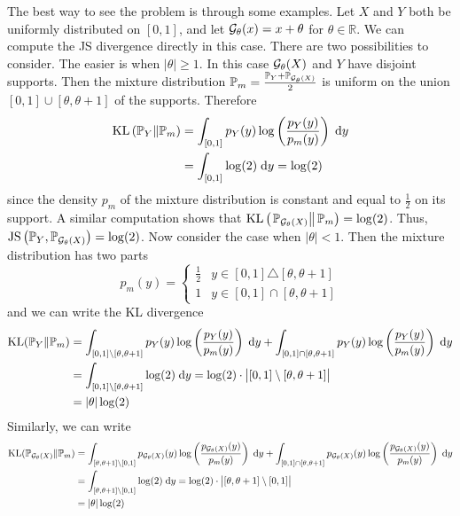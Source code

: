 \documentclass{article}
\newcommand{\dee}{\;\mathrm{d}}
\newcommand{\R}{\mathbb{R}}
\begin{document}
	The best way to see the problem is through some examples. Let \(X\) and \(Y\) both be uniformly distributed on \([0,1]\), and let \(\mathcal{G}_\theta(x) = x + \theta\) for \(\theta \in \R\). We can compute the JS divergence directly in this case. There are two possibilities to consider. The easier is when \(|\theta|\ge 1\). In this case \(\mathcal{G}_\theta(X)\) and \(Y\) have disjoint supports. Then the mixture distribution \(\mathbb{P}_m = \frac{\mathbb{P}_Y + \mathbb{P}_{\mathcal{G}_\theta(X)}}{2}\) is uniform on the union \([0,1]\cup[\theta, \theta + 1]\) of the supports. Therefore
	\begin{align*}
		\kld\left(\prob_Y \Vert \prob_m\right) &= \int_{[0,1]}p_Y(y)\log\left(\frac{p_Y(y)}{p_m(y)}\right)\dee y \\
		&= \int_{[0,1]} \log(2) \dee y = \log(2)
	\end{align*}
	since the density \(p_m\) of the mixture distribution is constant and equal to \(\frac{1}{2}\) on its support. A similar computation shows that \(\mathrm{KL}\left(\left.\mathbb{P}_{\mathcal{G}_\theta(X)}\right\Vert \mathbb{P}_m\right) = \log(2)\). Thus, \(\mathrm{JS}\left(\mathbb{P}_Y, \mathbb{P}_{\mathcal{G}_\theta(X)}\right) = \log(2)\). Now consider the case when \(|\theta| < 1\). Then the mixture distribution has two parts
	\begin{equation*}
		p_m(y) = \begin{cases}
			\frac{1}{2} & y \in [0,1] \triangle [\theta, \theta + 1] \\
			1 & y \in [0,1] \cap [\theta, \theta + 1]
		\end{cases}
	\end{equation*}
	and we can write the KL divergence
	\begin{align*}
		\kld(\prob_Y\Vert\prob_m) &= \int_{[0,1] \setminus [\theta, \theta + 1]} p_Y(y)\log\left(\frac{p_Y(y)}{p_m(y)}\right) \dee y + \int_{ [0,1] \cap [\theta, \theta + 1]} p_Y(y)\log\left(\frac{p_Y(y)}{p_m(y)}\right) \dee y \\
		&= \int_{ [0,1] \setminus [\theta, \theta + 1]} \log(2) \dee y = \log(2) \cdot \big|[0,1] \setminus[\theta, \theta+1]\big| \\
		&= |\theta|\log(2)
	\end{align*}
	Similarly, we can write
	\begin{align*}
		\kld(\prob_{\generator_{\theta}(X)} \Vert\prob_m) &= \int_{[\theta, \theta+1]\setminus[0,1]}p_{\generator_\theta(X)}(y)\log\left(\frac{p_{\generator_\theta(X)}(y)}{p_m(y)}\right)\dee y + \int_{[0,1] \cap [\theta, \theta + 1]}p_{\generator_\theta(X)}(y)\log\left(\frac{p_{\generator_\theta(X)}(y)}{p_m(y)}\right)\dee y \\
		&= \int_{[\theta, \theta+1]\setminus[0,1]}\log(2) \dee y = \log(2) \cdot \big|[\theta, \theta+1]\setminus[0,1]\big| \\
		&= |\theta| \log(2)
	\end{align*}
\end{document}
